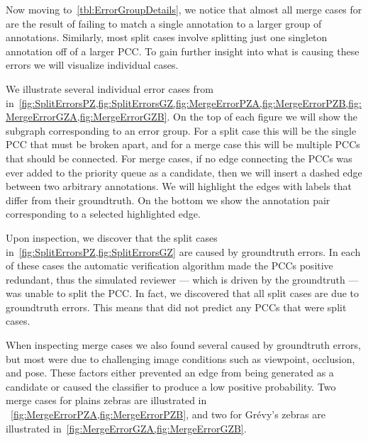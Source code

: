     Now moving to~\cref{tbl:ErrorGroupDetails},  we notice that almost all merge cases for  are the
      result of failing to match a single annotation to a larger group of annotations.
    Similarly, most split cases involve splitting just one singleton annotation off of a larger PCC.
    To gain further insight into what is causing these errors we will visualize individual cases.


    \ErrorSizeDetails{}

    \ErrorGroupDetails{}

    \FloatBarrier{}

    We illustrate several individual error cases from 
    in~\cref{fig:SplitErrorsPZ,fig:SplitErrorsGZ,fig:MergeErrorPZA,fig:MergeErrorPZB,fig:MergeErrorGZA,fig:MergeErrorGZB}.
    On the top of each figure we will show the subgraph corresponding to an error group.
    For a split case this will be the single PCC that must be broken apart, and for a merge case this will be
      multiple PCCs that should be connected.
    For merge cases, if no edge connecting the PCCs was ever added to the priority queue as a candidate, then we
      will insert a dashed edge between two arbitrary annotations.
    We will highlight the edges with labels that differ from their groundtruth.
    On the bottom we show the annotation pair corresponding to a selected highlighted edge.

    Upon inspection, we discover that the split cases in~\cref{fig:SplitErrorsPZ,fig:SplitErrorsGZ} are caused by
      groundtruth errors.
    In each of these cases the automatic verification algorithm made the PCCs positive redundant, thus the
      simulated reviewer --- which is driven by the groundtruth --- was unable to split the PCC.
    In fact, we discovered that all split cases are due to groundtruth errors.
    This means that  did not predict any PCCs that were split cases.

    When inspecting merge cases we also found several caused by groundtruth errors, but most were due to
      challenging image conditions such as viewpoint, occlusion, and pose.
    These factors either prevented an edge from being generated as a candidate or caused the classifier to
      produce a low positive probability.
    Two merge cases for plains zebras are illustrated in ~\cref{fig:MergeErrorPZA,fig:MergeErrorPZB}, and two for
      Grévy's zebras are illustrated in~\cref{fig:MergeErrorGZA,fig:MergeErrorGZB}.

